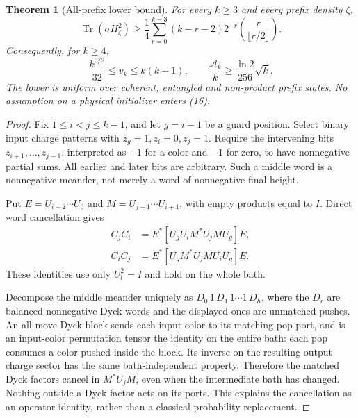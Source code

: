 \documentclass[11pt]{article}
\newtheorem{theorem}{Theorem}[section]
\newcommand{\Tr}{\operatorname{Tr}}
\begin{document}
\begin{theorem}[All-prefix lower bound]\label{thm:growth}
For every $k\ge3$ and every prefix density $\zeta$,
\[
 \Tr(\sigma H_\zeta^2)
 \ge\frac14\sum_{r=0}^{k-3}(k-r-2)
             2^{-r}\binom r{\lfloor r/2\rfloor}.
 \tag{16}
\]
Consequently, for $k\ge4$,
\[
 \frac{k^{3/2}}{32}\le v_k\le k(k-1),\qquad
 \frac{\mathcal A_k}{k}\ge\frac{\ln2}{256}\sqrt{k}.
 \tag{17}
\]
The lower is uniform over coherent, entangled and non-product prefix
states. No assumption on a physical initializer enters (16).
\end{theorem}
\begin{proof}
Fix $1\le i<j\le k-1$, and let $g=i-1$ be a guard position.
Select binary input charge patterns with $z_g=1,z_i=0,z_j=1$.
Require the intervening bits $z_{i+1},\ldots,z_{j-1}$, interpreted as
$+1$ for a color and $-1$ for zero, to have nonnegative partial sums.
All earlier and later bits are arbitrary. Such a middle word is a
nonnegative meander, not merely a word of nonnegative final height.

Put $E=U_{i-2}\cdots U_0$ and $M=U_{j-1}\cdots U_{i+1}$, with
empty products equal to $I$. Direct word cancellation gives
\begin{align}
 C_jC_i&=E^*[U_gU_iM^*U_jMU_g]E,\tag{W1}\label{eq:worda}\\
 C_iC_j&=E^*[U_gM^*U_jMU_iU_g]E.\tag{W2}\label{eq:wordb}
\end{align}
These identities use only $U_l^2=I$ and hold on the whole bath.

Decompose the middle meander uniquely as
$D_0\,1\,D_1\,1\cdots1\,D_h$, where the $D_r$ are balanced
nonnegative Dyck words and the displayed ones are unmatched pushes.
An all-move Dyck block sends each input color to its matching pop port,
and is an input-color permutation tensor the identity on the entire
bath: each pop consumes a color pushed inside the block. Its inverse
on the resulting output charge sector has the same bath-independent
property. Therefore the matched Dyck factors cancel in $M^*U_jM$,
even when the intermediate bath has changed. Nothing outside a Dyck
factor acts on its ports. This explains the cancellation as an operator
identity, rather than a classical probability replacement.


\end{proof}
\end{document}

